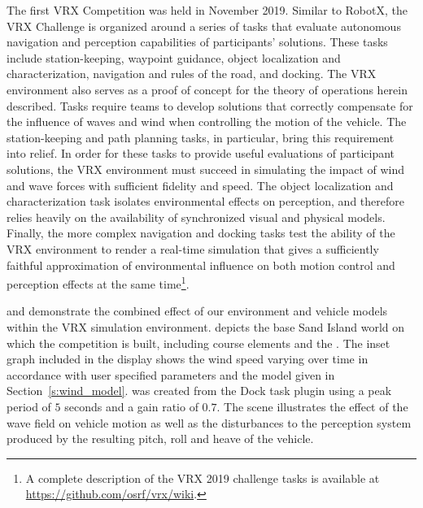\documentclass[utf8]{frontiersSCNS} %
\begin{document}
The first VRX Competition was held in November 2019. Similar to RobotX, the VRX Challenge is organized around a series of tasks that evaluate autonomous navigation and perception capabilities of participants' solutions. These tasks include station-keeping, waypoint guidance, object localization and characterization, navigation and rules of the road, and docking. The VRX environment also serves as a proof of concept for the theory of operations herein described. Tasks require teams to develop solutions that correctly compensate for the influence of waves and wind when controlling the motion of the vehicle. The station-keeping and path planning tasks, in particular, bring this requirement into relief. In order for these tasks to provide useful evaluations of participant solutions, the VRX environment must succeed in simulating the impact of wind and wave forces with sufficient fidelity and speed. The object localization and characterization task isolates environmental effects on perception, and therefore relies heavily on the availability of synchronized visual and physical models. Finally, the more complex navigation and docking tasks test the ability of the VRX environment to render a real-time simulation that gives a sufficiently faithful approximation of environmental influence on both motion control and perception effects at the same time\footnote{A complete description of the VRX 2019 challenge tasks is available at \url{https://github.com/osrf/vrx/wiki}.}.

 and  demonstrate the combined effect of our environment and vehicle models within the VRX simulation environment.  depicts the base Sand Island world on which the competition is built, including course elements and the \wamv{}. The inset graph included in the display shows the wind speed varying over time in accordance with user specified parameters and the model given in Section~\ref{s:wind_model}.  was created from the Dock task plugin using a peak period of $5$ seconds and a gain ratio of $0.7$. The scene illustrates the effect of the wave field on vehicle motion as well as the disturbances to the perception system produced by the resulting pitch, roll and heave of the vehicle. 
\end{document}

